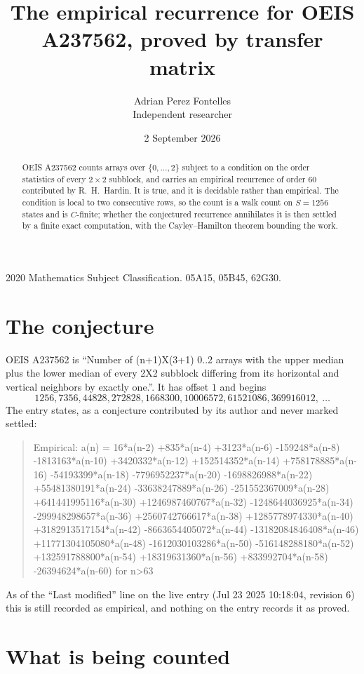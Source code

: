 \documentclass[11pt,a4paper]{article}
\title{The empirical recurrence for OEIS A237562, proved by transfer matrix}
\author{Adrian Perez Fontelles\\ \small Independent researcher}
\date{2 September 2026}
\theoremstyle{plain}
\theoremstyle{definition}
\begin{document}
\maketitle

\begin{abstract}
OEIS A237562 counts arrays over $\{0,\dots,2\}$ subject to a condition on the order
statistics of every $2\times2$ subblock, and carries an empirical recurrence of order
$60$ contributed by R.~H.~Hardin. It is true, and it is decidable rather than empirical.
The condition is local to two consecutive rows, so the count is a walk count on $S=1256$
states and is $C$-finite; whether the conjectured recurrence annihilates it is then settled by
a finite exact computation, with the Cayley--Hamilton theorem bounding the work.
\end{abstract}

\noindent\small 2020 Mathematics Subject Classification. 05A15, 05B45, 62G30.\normalsize

\section{The conjecture}

OEIS A237562 is ``Number of (n+1)X(3+1) 0..2 arrays with the upper median plus the lower median of every 2X2 subblock differing from its horizontal and vertical neighbors by exactly one.''. It has offset $1$ and begins
\[
1256, 7356, 44828, 272828, 1668300, 10006572, 61521086, 369916012,\ \dots
\]
The entry states, as a conjecture contributed by its author and never marked settled:
\begin{quote}
Empirical: a(n) = 16*a(n-2) +835*a(n-4) +3123*a(n-6) -159248*a(n-8) -1813163*a(n-10) +3420332*a(n-12) +152514352*a(n-14) +758178885*a(n-16) -54193399*a(n-18) -7796952237*a(n-20) -1698826988*a(n-22) +55481380191*a(n-24) -33638247889*a(n-26) -251552367009*a(n-28) +641441995116*a(n-30) +1246987460767*a(n-32) -1248644036925*a(n-34) -299948298657*a(n-36) +2560742766617*a(n-38) +1285778974330*a(n-40) +3182913517154*a(n-42) -8663654405072*a(n-44) -13182084846408*a(n-46) +11771304105080*a(n-48) -1612030103286*a(n-50) -516148288180*a(n-52) +132591788800*a(n-54) +18319631360*a(n-56) +833992704*a(n-58) -26394624*a(n-60) for n>63
\end{quote}
As of the ``Last modified'' line on the live entry (Jul 23 2025 10:18:04, revision 6) this is still
recorded as empirical, and nothing on the entry records it as proved.

\section{What is being counted}
\end{document}
